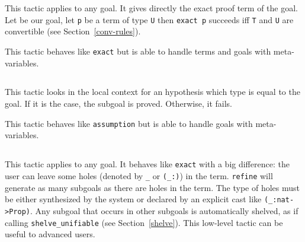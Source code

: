 This tactic applies to any goal. It gives directly the exact proof
term of the goal. Let {\T} be our goal, let {\tt p} be a term of type
{\tt U} then {\tt exact p} succeeds iff {\tt T} and {\tt U} are
convertible (see Section~\ref{conv-rules}).

\begin{ErrMsgs}
\item {}
\end{ErrMsgs}

\begin{Variants}
  \item {}

    This tactic behaves like \texttt{exact} but is able to handle terms
    and goals with meta-variables.

\end{Variants}

\subsection{}

This tactic looks in the local context for an
hypothesis which type is equal to the goal.  If it is the case, the
subgoal is proved. Otherwise, it fails.

\begin{ErrMsgs}
\item  {}
\end{ErrMsgs}

\begin{Variants}
  \item {}

    This tactic behaves like \texttt{assumption} but is able to handle
    goals with meta-variables.

\end{Variants}

\subsection{}
\label{refine}
\label{refine-example}

This tactic applies to any goal. It behaves like {\tt exact} with a big
difference: the user can leave some holes (denoted by \texttt{\_} or
{\tt (\_:\type)}) in the term. {\tt refine} will generate as
many subgoals as there are holes in the term. The type of holes must be
either synthesized by the system or declared by an
explicit cast like \verb|(_:nat->Prop)|. Any subgoal that occurs in other
subgoals is automatically shelved, as if calling {\tt shelve\_unifiable}
(see Section~\ref{shelve}).
This low-level tactic can be useful to advanced users.

